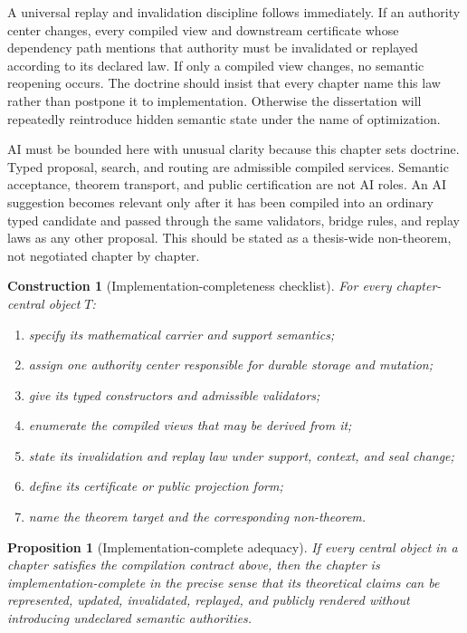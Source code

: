\documentclass[11pt]{report}
\newtheorem{proposition}[definition]{Proposition}
\newtheorem{construction}[definition]{Construction}
\begin{document}
A universal replay and invalidation discipline follows immediately. If an authority center changes, every compiled view and downstream certificate whose dependency path mentions that authority must be invalidated or replayed according to its declared law. If only a compiled view changes, no semantic reopening occurs. The doctrine should insist that every chapter name this law rather than postpone it to implementation. Otherwise the dissertation will repeatedly reintroduce hidden semantic state under the name of optimization.

AI must be bounded here with unusual clarity because this chapter sets doctrine. Typed proposal, search, and routing are admissible compiled services. Semantic acceptance, theorem transport, and public certification are not AI roles. An AI suggestion becomes relevant only after it has been compiled into an ordinary typed candidate and passed through the same validators, bridge rules, and replay laws as any other proposal. This should be stated as a thesis-wide non-theorem, not negotiated chapter by chapter.

\begin{construction}[Implementation-completeness checklist]
For every chapter-central object $T$:
\begin{enumerate}
\item specify its mathematical carrier and support semantics;
\item assign one authority center responsible for durable storage and mutation;
\item give its typed constructors and admissible validators;
\item enumerate the compiled views that may be derived from it;
\item state its invalidation and replay law under support, context, and seal change;
\item define its certificate or public projection form;
\item name the theorem target and the corresponding non-theorem.
\end{enumerate}
\end{construction}

\begin{proposition}[Implementation-complete adequacy]
If every central object in a chapter satisfies the compilation contract above, then the chapter is implementation-complete in the precise sense that its theoretical claims can be represented, updated, invalidated, replayed, and publicly rendered without introducing undeclared semantic authorities.
\end{proposition}
\end{document}
